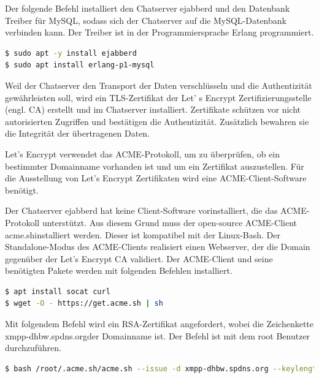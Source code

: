 \documentclass[a4paper,titlepage,halfparskip,12pt]{scrreprt}
\begin{document}
\begin{onehalfspacing}
Der folgende Befehl installiert den Chatserver ejabberd und den Datenbank Treiber für MySQL, sodass sich der Chatserver auf die MySQL-Datenbank verbinden kann. Der Treiber ist in der Programmiersprache Erlang programmiert.

\bigskip

\begin{lstlisting}[language=bash, caption={Installation von ejabberd und des MySQL Datenbanktreibers}]
$ sudo apt -y install ejabberd
$ sudo apt install erlang-p1-mysql
\end{lstlisting}

Weil der Chatserver den Transport der Daten verschlüsseln und die Authentizität gewährleisten soll, wird ein TLS-Zertifikat der Let' s Encrypt Zertifizierungsstelle (engl. \ac{CA}) erstellt und im Chatserver installiert. Zertifikate schützen vor nicht autorisierten Zugriffen und bestätigen die Authentizität. Zusätzlich bewahren sie die Integrität der übertragenen Daten.\cite{melzer2010web}

Let's Encrypt verwendet das ACME-Protokoll, um zu überprüfen, ob ein bestimmter Domainname vorhanden ist und um ein Zertifikat auszustellen. Für die Ausstellung von Let's Encrypt Zertifikaten wird eine ACME-Client-Software benötigt.\cite{letsencryptACME}

Der Chatserver ejabberd hat keine Client-Software vorinstalliert, die das ACME-Protokoll unterstützt. Aus diesem Grund muss der open-source ACME-Client \glqq acme.sh\grqq installiert werden. Dieser ist kompatibel mit der Linux-Bash. Der Standalone-Modus des ACME-Clients realisiert einen Webserver, der die Domain gegenüber der Let's Encrypt \ac{CA} validiert.\cite{acmeshOfficial}
Der ACME-Client und seine benötigten Pakete werden mit folgenden Befehlen installiert.

\bigskip

\begin{lstlisting}[language=bash, caption={Installation der ACME-Client-Software für die Domainvalidierung}]
$ apt install socat curl
$ wget -O - https://get.acme.sh | sh
\end{lstlisting}

Mit folgendem Befehl wird ein \ac{RSA}-Zertifikat angefordert, wobei die Zeichenkette \glqq xmpp-dhbw.spdns.org\grqq der Domainname ist. Der Befehl ist mit dem root Benutzer durchzuführen.

\bigskip

\begin{lstlisting}[language=bash, caption={Installation des Let's Encrpt Zertifikats durch den ACME-Client}]
$ bash /root/.acme.sh/acme.sh --issue -d xmpp-dhbw.spdns.org --keylength 4096 --standalone
\end{lstlisting}


\end{onehalfspacing}
\end{document}
